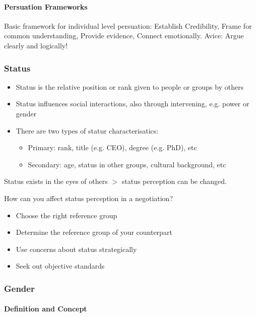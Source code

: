 \paragraph{Persuation Frameworks}
Basic framework for individual level persuation:
Establish Credibility, Frame for common understanding, Provide evidence,
Connect emotionally.
Avice: Argue clearly and logically!

\subsubsection{Status}

\begin{itemize}
    \item Status is the relative position or rank given to people or groups
        by others
    \item Status influences social interactions, also through intervening,
        e.g. power or gender
    \item There are two types of statur characterisatics:
        \begin{itemize}
            \item Primary: rank, title (e.g. CEO), degree (e.g. PhD), etc
            \item Secondary: age, status in other groups, cultural background, etc
        \end{itemize}
\end{itemize}
Status exists in the eyes of others $>$ status perception can be changed.

How can you affect status perception in a negotiation?
\begin{itemize}
    \item Choose the right reference group
    \item Determine the reference group of your counterpart
    \item Use concerns about status strategically
    \item Seek out objective standards
\end{itemize}

\subsubsection{Gender}

\paragraph{Definition and Concept}


